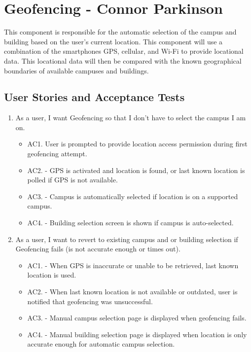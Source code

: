 \documentclass{scrreprt}
\begin{document}
\pagebreak

\section{Geofencing - Connor Parkinson}

This component is responsible for the automatic selection of the campus and building based on the user’s current location. This component will use a combination of the smartphones GPS, cellular, and Wi-Fi to provide locational data. This locational data will then be compared with the known geographical boundaries of available campuses and buildings.


\subsection{User Stories and Acceptance Tests}

\begin{enumerate}
	\item As a user, I want Geofencing so that I don't have to select the campus I am on.
	
		\begin{itemize}
			\item AC1. User is prompted to provide location access permission during first geofencing attempt.
			\item AC2. - GPS is activated and location is found, or last known location is polled if GPS is not available.
			\item AC3. - Campus is automatically selected if location is on a supported campus.
			\item AC4. - Building selection screen is shown if campus is auto-selected.

		\end{itemize}
	
	\item As a user, I want to revert to existing campus and or building selection if Geofencing fails (is not accurate enough or times out).
	
		\begin{itemize}
			\item AC1. - When GPS is inaccurate or unable to be retrieved, last known location is used.
			
			\item AC2. - When last known location is not available or outdated, user is notified that geofencing was unsuccessful.
			
			\item AC3. - Manual campus selection page is displayed when geofencing fails.
			
			\item AC4. - Manual building selection page is displayed when location is only accurate enough for automatic campus selection.
		\end{itemize}
\end{enumerate}
\end{document}
